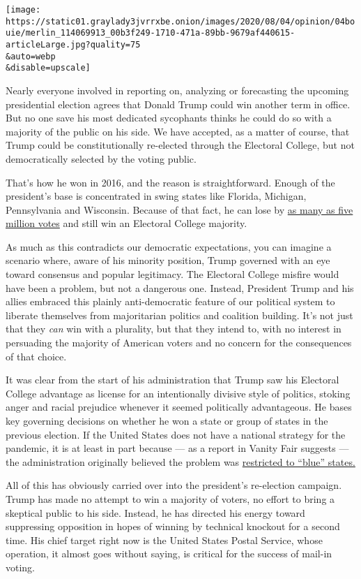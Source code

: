 \texttt{[image: https://static01.graylady3jvrrxbe.onion/images/2020/08/04/opinion/04bouie/merlin\_114069913\_00b3f249-1710-471a-89bb-9679af440615-articleLarge.jpg?quality=75\\\&auto=webp\\\&disable=upscale]}

Nearly everyone involved in reporting on, analyzing or forecasting the
upcoming presidential election agrees that Donald Trump could win
another term in office. But no one save his most dedicated sycophants
thinks he could do so with a majority of the public on his side. We have
accepted, as a matter of course, that Trump could be constitutionally
re-elected through the Electoral College, but not democratically
selected by the voting public.

That's how he won in 2016, and the reason is straightforward. Enough of
the president's base is concentrated in swing states like Florida,
Michigan, Pennsylvania and Wisconsin. Because of that fact, he can lose
by
\href{https://www.nbcnews.com/politics/2020-election/how-trump-could-lose-5-million-votes-still-win-2020-n1031601}{as
many as five million votes} and still win an Electoral College majority.

As much as this contradicts our democratic expectations, you can imagine
a scenario where, aware of his minority position, Trump governed with an
eye toward consensus and popular legitimacy. The Electoral College
misfire would have been a problem, but not a dangerous one. Instead,
President Trump and his allies embraced this plainly anti-democratic
feature of our political system to liberate themselves from majoritarian
politics and coalition building. It's not just that they \emph{can} win
with a plurality, but that they intend to, with no interest in
persuading the majority of American voters and no concern for the
consequences of that choice.

It was clear from the start of his administration that Trump saw his
Electoral College advantage as license for an intentionally divisive
style of politics, stoking anger and racial prejudice whenever it seemed
politically advantageous. He bases key governing decisions on whether he
won a state or group of states in the previous election. If the United
States does not have a national strategy for the pandemic, it is at
least in part because --- as a report in Vanity Fair suggests --- the
administration originally believed the problem was
\href{https://www.vanityfair.com/news/2020/07/how-jared-kushners-secret-testing-plan-went-poof-into-thin-air}{restricted
to ``blue'' states.}

All of this has obviously carried over into the president's re-election
campaign. Trump has made no attempt to win a majority of voters, no
effort to bring a skeptical public to his side. Instead, he has directed
his energy toward suppressing opposition in hopes of winning by
technical knockout for a second time. His chief target right now is the
United States Postal Service, whose operation, it almost goes without
saying, is critical for the success of mail-in voting.

